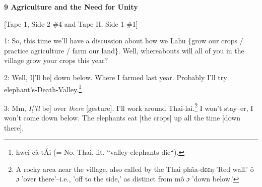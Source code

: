 
\textbf{9 Agriculture and the Need for Unity}

[Tape 1,  Side 2 \#4 and Tape II, Side 1 \#1]

1: So, this time we'll have a discussion about how we Lahu \{grow our crops / practice
agriculture / farm our land\}. Well, whereabouts will all of you in the village
grow your crops this year?

2: Well, I['ll be] down below. Where I farmed last year. Probably I'll try elephant's-Death-Valley.\footnote{hwei-cà-tÁi (= No. Thai, lit. ``valley-elephants-die``).}

3: Mm, \textit{I['ll} be] over \textit{there} [gesture]. I'll work around Thai-lai.\footnote{A rocky area near the village, also called by the Thai phǎa-dɛɛŋ 'Red wall.' ô \emph{ɔ} 'over there'--i.e., 'off to the side,' as distinct from mô \emph{ɔ} 'down below.'}
I won't stay--er, I won't come down below. The elephants eat [the crops] up all
the time [down there].

